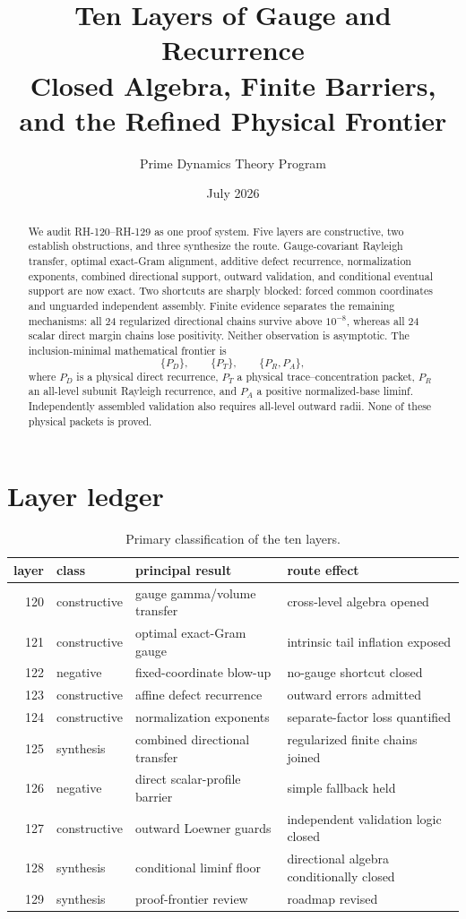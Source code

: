 \documentclass[12pt]{article}\usepackage[margin=1in]{geometry}\usepackage{amsmath,amssymb,amsthm,booktabs,graphicx,natbib,microtype}\newtheorem{theorem}{Theorem}\newtheorem{remark}[theorem]{Remark}
\title{Ten Layers of Gauge and Recurrence\\\large Closed Algebra, Finite Barriers, and the Refined Physical Frontier}\author{Prime Dynamics Theory Program}\date{July 2026}
\begin{document}
\maketitle
\begin{abstract}
We audit RH-120--RH-129 as one proof system.  Five layers are constructive,
two establish obstructions, and three synthesize the route.  Gauge-covariant
Rayleigh transfer, optimal exact-Gram alignment, additive defect recurrence,
normalization exponents, combined directional support, outward validation,
and conditional eventual support are now exact.  Two shortcuts are sharply
blocked: forced common coordinates and unguarded independent assembly.
Finite evidence separates the remaining mechanisms: all 24 regularized
directional chains survive above $10^{-8}$, whereas all 24 scalar direct
margin chains lose positivity.  Neither observation is asymptotic.  The
inclusion-minimal mathematical frontier is
\[
\{P_D\},\qquad\{P_T\},\qquad\{P_R,P_A\},
\]
where $P_D$ is a physical direct recurrence, $P_T$ a physical
trace--concentration packet, $P_R$ an all-level subunit Rayleigh recurrence,
and $P_A$ a positive normalized-base liminf.  Independently assembled
validation also requires all-level outward radii.  None of these physical
packets is proved.
\end{abstract}
\section{Layer ledger}
\begin{table}[h]\centering\small
\begin{tabular}{rlll}\toprule
layer&class&principal result&route effect\\\midrule
120&constructive&gauge gamma/volume transfer&cross-level algebra opened\\
121&constructive&optimal exact-Gram gauge&intrinsic tail inflation exposed\\
122&negative&fixed-coordinate blow-up&no-gauge shortcut closed\\
123&constructive&affine defect recurrence&outward errors admitted\\
124&constructive&normalization exponents&separate-factor loss quantified\\
125&synthesis&combined directional transfer&regularized finite chains joined\\
126&negative&direct scalar-profile barrier&simple fallback held\\
127&constructive&outward Loewner guards&independent validation logic closed\\
128&synthesis&conditional liminf floor&directional algebra conditionally closed\\
129&synthesis&proof-frontier review&roadmap revised\\\bottomrule
\end{tabular}\caption{Primary classification of the ten layers.}\end{table}
\end{document}
